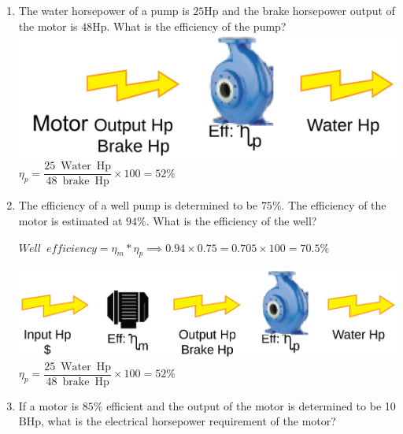 \documentclass{article}
\begin{document}
\begin{enumerate}
\item The water horsepower of a pump is $25 \mathrm{Hp}$ and the brake horsepower output of the motor is $48 \mathrm{Hp}$. What is the efficiency of the pump?\\
\vspace{0.4cm}
\includegraphics[scale=0.32]{PumpingProblemPump}\\
\vspace{0.4cm}
$\eta_p=\dfrac{25 \mathrm{\enspace Water \enspace Hp}}{48 \mathrm{\enspace brake \enspace Hp}} \times 100=52 \%$
 
 
\item The efficiency of a well pump is determined to be $75 \%$. The efficiency of the motor is estimated at $94 \%$. What is the efficiency of the well?

 \vspace{0.2cm}
$Well \enspace efficiency=\eta_m * \eta_p \implies 0.94 \times 0.75=0.705 \times 100=70.5 \%$
 \vspace{0.2cm}

\vspace{0.32cm}\includegraphics[scale=0.08]{PumpProblem}\\
 \vspace{0.2cm}
$\eta_p=\dfrac{25 \mathrm{\enspace Water \enspace Hp}}{48 \mathrm{\enspace brake \enspace Hp}} \times 100=52 \%$
  \vspace{0.4cm}
  
  
\item If a motor is $85 \%$ efficient and the output of the motor is determined to be 10
$\mathrm{BHp}$, what is the electrical horsepower requirement of the motor?



\end{enumerate}
\end{document}
